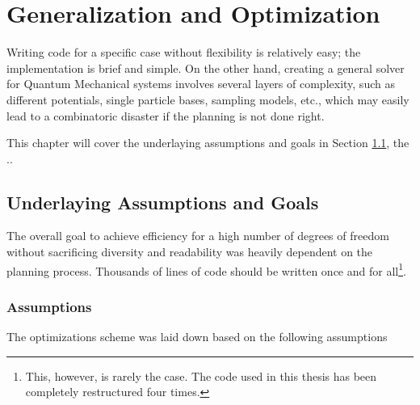 \chapter{Generalization and Optimization}

Writing code for a specific case without flexibility is relatively easy; the implementation is brief and simple. On the other hand, creating a general solver for Quantum Mechanical systems involves several layers of complexity, such as different potentials, single particle bases, sampling models, etc., which may easily lead to a combinatoric disaster if the planning is not done right. 

This chapter will cover the underlaying assumptions and goals in Section \ref{sec:AssGoal}, the ..

\section{Underlaying Assumptions and Goals}
\label{sec:AssGoal}

The overall goal to achieve efficiency for a high number of degrees of freedom without sacrificing diversity and readability was heavily dependent on the planning process. Thousands of lines of code should be written once and for all\footnote{This, however, is rarely the case. The code used in this thesis has been completely restructured four times.}.

\subsection{Assumptions}
\label{sec:ass}

The optimizations scheme was laid down based on the following assumptions


